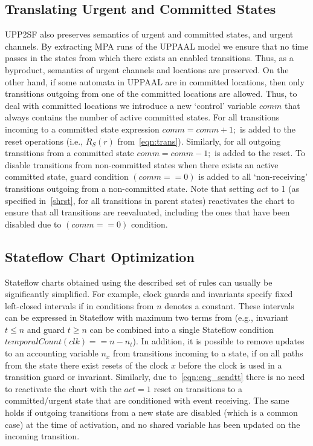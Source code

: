 \subsection{Translating Urgent and Committed States}
UPP2SF also preserves semantics of urgent and committed states, and urgent channels. By extracting MPA runs of the UPPAAL model we ensure that no time passes in the states from which there exists an enabled transitions. Thus, as a byproduct, semantics of urgent channels and locations are preserved. On the other hand, if some automata in UPPAAL are in committed locations, then only transitions {outgoing} from one of the committed locations are allowed. Thus, to deal with committed locations we introduce a new `control' variable $comm$ that always contains the number of active committed states. For all transitions incoming to a committed state expression $comm=comm+1;$ is added to the reset operations (i.e., $R_S(r)$ from~\eqref{eqn:trans}). Similarly, for all outgoing transitions from a committed state $comm=comm-1;$ is added to the reset. To disable transitions from non-committed states when there exists an active committed state, guard condition $(comm==0)$ is added to all `non-receiving' transitions outgoing from a non-committed state. Note that setting $act$ to 1 (as specified in~\eqref{shrst}, for all transitions in parent states) reactivates the chart to ensure that all transitions are reevaluated, including the ones that have been disabled due to $(comm==0)$ condition.


\subsection{Stateflow Chart Optimization}
Stateflow charts obtained using the described set of rules can usually be significantly simplified. For example, clock guards and invariants specify fixed left-closed intervals if in conditions from  $n$ denotes a constant. 
These intervals can be expressed in Stateflow with maximum two terms from  (e.g., invariant $t\leq n$ and guard $t\geq n$ can be combined into a single Stateflow condition $temporalCount(clk)==n-n_t$).
In addition, it is possible to remove updates to an accounting variable $n_x$ from transitions incoming to a state, 
if on all paths from the state there exist resets of the clock $x$ before the clock is used in a transition guard or invariant. Similarly, due to~\eqref{eqn:eng_sendtt} there is no need to reactivate the chart with the $act=1$ reset on transitions to a committed/urgent state that are conditioned with event receiving. The same holds if outgoing transitions from a new state are disabled (which is a common case) at the time of activation, and no shared variable has been updated on the incoming transition.

